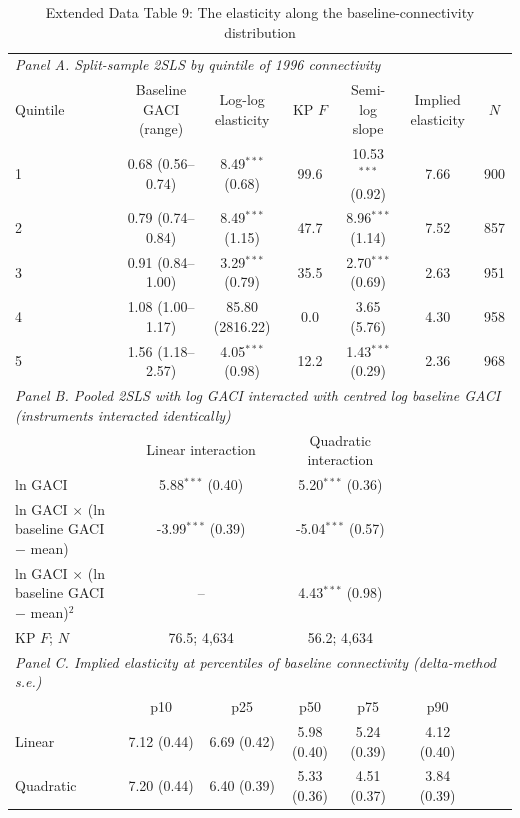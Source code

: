 \documentclass[12pt]{article}
\begin{document}
\begin{table}[htbp]
\centering
\begin{threeparttable}
\caption{Extended Data Table 9: The elasticity along the baseline-connectivity distribution}
\label{tab:gradient}
\footnotesize
\begin{tabular}{lcccccc}
\toprule
\multicolumn{7}{l}{\textit{Panel A. Split-sample 2SLS by quintile of 1996 connectivity}} \\
Quintile & Baseline GACI (range) & Log-log elasticity & KP $F$ & Semi-log slope & Implied elasticity & $N$ \\
\midrule
  1 & 0.68 (0.56--0.74) & 8.49$^{***}$ (0.68) & 99.6 & 10.53$^{***}$ (0.92) & 7.66 & 900 \\
  2 & 0.79 (0.74--0.84) & 8.49$^{***}$ (1.15) & 47.7 & 8.96$^{***}$ (1.14) & 7.52 & 857 \\
  3 & 0.91 (0.84--1.00) & 3.29$^{***}$ (0.79) & 35.5 & 2.70$^{***}$ (0.69) & 2.63 & 951 \\
  4 & 1.08 (1.00--1.17) & 85.80 (2816.22) & 0.0 & 3.65 (5.76) & 4.30 & 958 \\
  5 & 1.56 (1.18--2.57) & 4.05$^{***}$ (0.98) & 12.2 & 1.43$^{***}$ (0.29) & 2.36 & 968 \\
\midrule
\multicolumn{7}{l}{\textit{Panel B. Pooled 2SLS with log GACI interacted with centred log baseline GACI (instruments interacted identically)}} \\
 & \multicolumn{2}{c}{Linear interaction} & \multicolumn{2}{c}{Quadratic interaction} & & \\
  ln GACI & \multicolumn{2}{c}{5.88$^{***}$ (0.40)} & \multicolumn{2}{c}{5.20$^{***}$ (0.36)} & & \\
  ln GACI $\times$ (ln baseline GACI $-$ mean) & \multicolumn{2}{c}{-3.99$^{***}$ (0.39)} & \multicolumn{2}{c}{-5.04$^{***}$ (0.57)} & & \\
  ln GACI $\times$ (ln baseline GACI $-$ mean)$^2$ & \multicolumn{2}{c}{--} & \multicolumn{2}{c}{4.43$^{***}$ (0.98)} & & \\
  KP $F$; $N$ & \multicolumn{2}{c}{76.5; 4,634} & \multicolumn{2}{c}{56.2; 4,634} & & \\
\midrule
\multicolumn{7}{l}{\textit{Panel C. Implied elasticity at percentiles of baseline connectivity (delta-method s.e.)}} \\
 & p10 & p25 & p50 & p75 & p90 & \\
  Linear & 7.12 (0.44) & 6.69 (0.42) & 5.98 (0.40) & 5.24 (0.39) & 4.12 (0.40) & \\
  Quadratic & 7.20 (0.44) & 6.40 (0.39) & 5.33 (0.36) & 4.51 (0.37) & 3.84 (0.39) & \\

\end{tabular}
\end{threeparttable}
\end{table}
\end{document}
